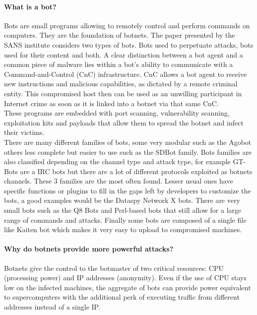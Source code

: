 \cite{honeynet}
\paragraph{What is a bot?} Bots are small programs allowing to remotely control and perform commands on computers. They are the foundation of botnets. The paper presented by the SANS institute considers two types of bots. Bots used to perpetuate attacks, bots used for their content and both. \cite{tracking}
\cite{bot-com}
A clear distinction between a bot agent and a common piece of malware lies within a bot's ability to communicate with a Command-and-Control (CnC) infrastructure. CnC allows a bot agent to receive new instructions and malicious capabilities, as dictated by a remote criminal entity. This compromised host then can be used as an unwilling participant in Internet crime as soon as it is linked into a botnet via that same CnC.\\
These programs are embedded with port scanning, vulnerability scanning, exploitation kits and payloads that allow them to spread the botnet and infect their victims.\\
There are many different families of bots, some very modular such as the Agobot others less complete but easier to use such as the SDBot family. Bots families are also classified depending on the channel type and attack type, for example GT-Bots are a IRC bots but there are a lot of different protocols exploited as botnets channels. These 3 families are the most often found. Lesser usual ones have specific functions or plugins to fill in the gaps left by developers to customize the bots, a good examples would be the Dataspy Network X bots. There are very small bots such as the Q8 Bots and Perl-based bots that still allow for a large range of commands and attacks. Finally some bots are composed of a single file like Kaiten bot which makes it very easy to upload to compromised machines.

\cite{survey4}
\paragraph{Why do botnets provide more powerful attacks?} Botnets give the control to the botmaster of two critical resources: CPU (processing power) and IP addresses (anonymity). Even if the use of CPU stays low on the infected machines, the aggregate of bots can provide power equivalent to supercomputers with the additional perk of executing traffic from different addresses instead of a single IP.

